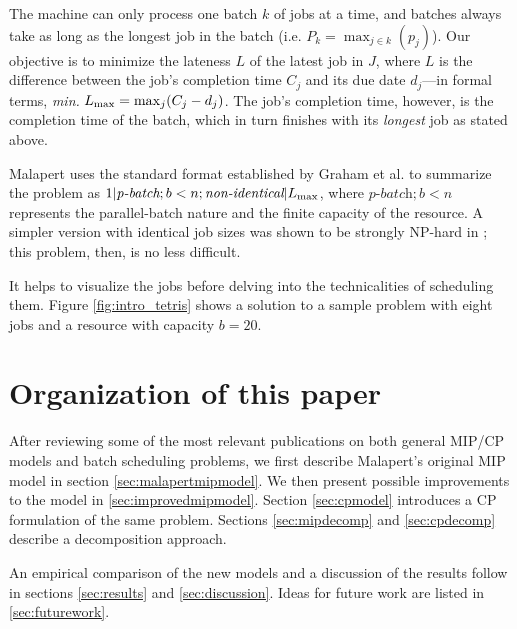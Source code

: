\documentclass[13pt, letterpaper, oneside]{book}
\begin{document}
The machine can only process one batch $k$ of jobs at a time, and batches always
take as long as the longest job in the batch (i.e. $P_k = \max_{j \in k}(p_j)$).
Our objective is to minimize the lateness $L$ of the latest job in $J$, where
$L$ is the difference between the job's completion time $C_j$ and its due date
$d_j$---in formal terms, \textit{min.} $L_{\text{max}} = \max_j(C_j - d_j)$. The job's
completion time, however, is the completion time of the batch, which in turn
finishes with its \textit{longest} job as stated above.

Malapert uses the standard format established by Graham et al. to
summarize the problem as $1|\textit{p-batch}; b < n;
\textit{non-identical}|L_{\text{max}}$, where $\textit{p-batch};b<n$ represents the
parallel-batch nature and the finite capacity of the resource. A simpler version
with identical job sizes was shown to be strongly NP-hard in \citep{Brucker};
this problem, then, is no less difficult.

It helps to visualize the jobs before delving into the technicalities of
scheduling them. Figure \ref{fig:intro_tetris} shows a solution to a sample
problem with eight jobs and a resource with capacity $b = 20$.


\section{Organization of this paper}
After reviewing some of the most relevant publications on both general MIP/CP models and
batch scheduling problems, we first describe Malapert's original MIP model in
section \ref{sec:malapertmipmodel}. We then present possible improvements to the
model in \ref{sec:improvedmipmodel}. Section \ref{sec:cpmodel} introduces a CP formulation of the same
problem. Sections \ref{sec:mipdecomp} and \ref{sec:cpdecomp} describe a
decomposition approach.

An empirical comparison of the new models and a discussion of the results follow in
sections \ref{sec:results} and \ref{sec:discussion}. Ideas for future work are
listed in \ref{sec:futurework}.


\end{document}
